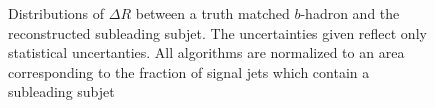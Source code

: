 \begin{figure}[!htbp]
  \centering
   \hfill

  \caption{\cite{ATL-PHYS-PUB-2017-010} Distributions of $\Delta R$ between a
truth matched $b$-hadron and the reconstructed subleading subjet.  The
uncertainties given reflect only statistical uncertanties.  All algorithms are
normalized to an area corresponding to the fraction of signal jets which
contain a subleading subjet} 
  \label{sec:objects:subleading_vr}
\end{figure}




